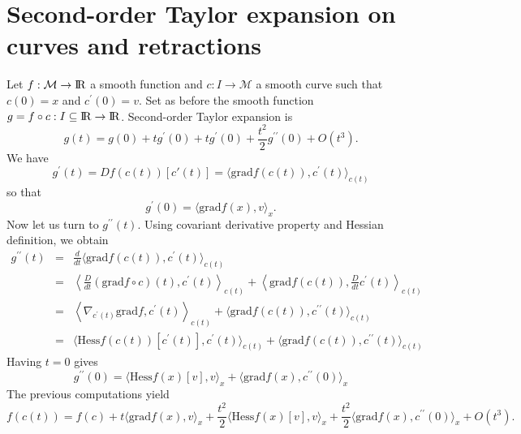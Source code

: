 \documentclass[10pt,a4paper]{book}
\theoremstyle{definition}
\theoremstyle{plain}
\theoremstyle{remark}
\newcommand{\grad}{\textrm{grad}}
\newcommand \M {\mathcal{M}}
\def\R{{\rm I\kern-0.16em R}}
\begin{document}
\section{Second-order Taylor expansion on curves and retractions}
Let $f: \M \to \R$ a smooth function and $c:I\to \M$ a smooth curve such that $c(0)=x$ and $c^{\prime}(0)=v$. Set as before  the smooth function $g=f\circ c: I\subseteq \R \to \R$. Second-order Taylor expansion is
$$g(t)=g(0)+tg^{\prime}(0)+tg^{\prime}(0)+\frac{t^2}{2}g^{\prime \prime}(0)+O(t^3).$$
We have
$$g^{\prime}(t)=Df(c(t))[c'(t)]=\langle \grad f(c(t)),c^{\prime}(t)\rangle_{c(t)}$$
so that
$$g^{\prime}(0)=\langle \grad f(x),v\rangle_x.$$
Now let us turn to $g^{\prime \prime}(t)$. Using covariant derivative property and Hessian definition, we obtain
\begin{eqnarray*}
g^{\prime \prime}(t) &=&\frac{d}{dt}\langle \grad f(c(t)),c^{\prime}(t)\rangle_{c(t)}\\
&=&\left \langle \frac{D}{dt}(\grad f \circ c)(t),c^{\prime}(t)\right\rangle_{c(t)}+\left\langle \grad f(c(t)),\frac{D}{dt}c^{\prime}(t)\right\rangle_{c(t)}\\
&=&\left\langle \nabla_{c^{\prime}(t)}\grad f, c^{\prime}(t)\right \rangle_{c(t)}+\langle \grad f(c(t)),c^{\prime \prime}(t)\rangle_{c(t)}\\
&=&\langle \text{Hess}f(c(t))[c^{\prime}(t)],c^{\prime}(t)\rangle_{c(t)}+\langle \grad f(c(t)),c^{\prime \prime}(t)\rangle_{c(t)}
\end{eqnarray*}
Having $t=0$ gives
$$g^{\prime \prime}(0)=\langle \text{Hess}f(x)[v],v\rangle_x+\langle \grad f(x),c^{\prime \prime}(0)\rangle_{x}$$
The previous computations yield 
$$f(c(t))=f(c)+t\langle \grad f(x),v\rangle_x+\frac{t^2}{2}\langle \text{Hess}f(x)[v],v\rangle_x +\frac{t^2}{2}\langle \grad f(x),c^{\prime \prime}(0)\rangle_x+O(t^3).$$
\end{document}
